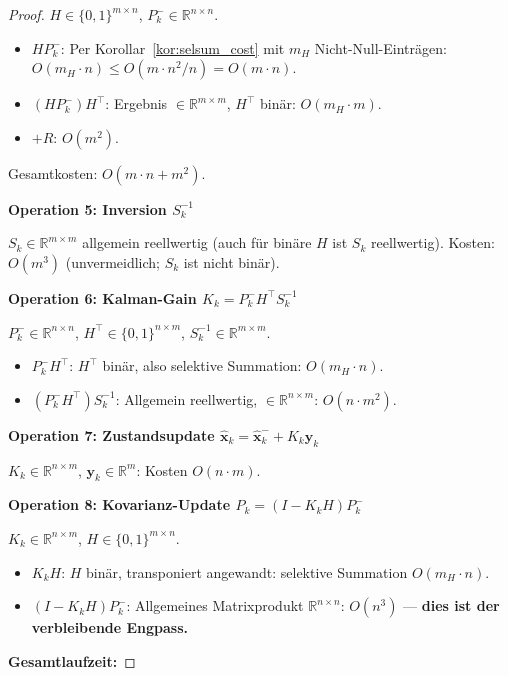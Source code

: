 ﻿\documentclass[a4paper,12pt]{article}
\theoremstyle{definition}
\begin{document}
\begin{proof}
$H \in \{0,1\}^{m\times n}$, $P_k^- \in \mathbb{R}^{n\times n}$.
\begin{itemize}
    \item $HP_k^-$: Per Korollar~\ref{kor:selsum_cost} mit $m_H$ Nicht-Null-Einträgen:
          $O(m_H \cdot n) \leq O(m \cdot n^2 / n) = O(m \cdot n)$.
    \item $(HP_k^-)H^\top$: Ergebnis $\in \mathbb{R}^{m\times m}$, $H^\top$ binär:
          $O(m_H \cdot m)$.
    \item $+R$: $O(m^2)$.
\end{itemize}
Gesamtkosten: $O(m \cdot n + m^2)$.

\medskip
\textbf{Operation 5: Inversion $S_k^{-1}$}

$S_k \in \mathbb{R}^{m\times m}$ allgemein reellwertig (auch für binäre $H$
ist $S_k$ reellwertig). Kosten: $O(m^3)$ (unvermeidlich; $S_k$ ist nicht binär).

\medskip
\textbf{Operation 6: Kalman-Gain $K_k = P_k^- H^\top S_k^{-1}$}

$P_k^- \in \mathbb{R}^{n\times n}$, $H^\top \in \{0,1\}^{n\times m}$, $S_k^{-1} \in \mathbb{R}^{m\times m}$.
\begin{itemize}
    \item $P_k^- H^\top$: $H^\top$ binär, also selektive Summation: $O(m_H \cdot n)$.
    \item $(P_k^- H^\top) S_k^{-1}$: Allgemein reellwertig, $\in \mathbb{R}^{n\times m}$:
          $O(n \cdot m^2)$.
\end{itemize}

\medskip
\textbf{Operation 7: Zustandsupdate $\hat{\mathbf{x}}_k = \hat{\mathbf{x}}_k^- + K_k \mathbf{y}_k$}

$K_k \in \mathbb{R}^{n\times m}$, $\mathbf{y}_k \in \mathbb{R}^m$: Kosten $O(n \cdot m)$.

\medskip
\textbf{Operation 8: Kovarianz-Update $P_k = (I - K_k H) P_k^-$}

$K_k \in \mathbb{R}^{n\times m}$, $H \in \{0,1\}^{m\times n}$.
\begin{itemize}
    \item $K_k H$: $H$ binär, transponiert angewandt: selektive Summation
          $O(m_H \cdot n)$.
    \item $(I - K_kH) P_k^-$: Allgemeines Matrixprodukt $\mathbb{R}^{n\times n}$:
          $O(n^3)$ --- \textbf{dies ist der verbleibende Engpass.}
\end{itemize}

\medskip
\textbf{Gesamtlaufzeit:}


\end{proof}
\end{document}

